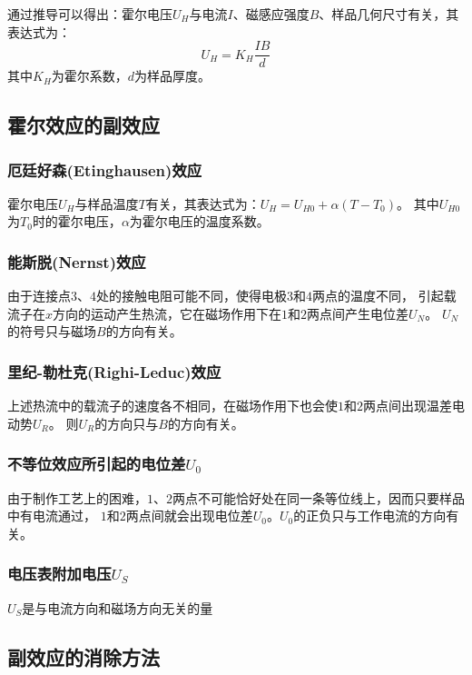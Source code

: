 \documentclass[UTF8]{ctexart}
\begin{document}
通过推导可以得出：霍尔电压$U_H$与电流$I$、磁感应强度$B$、样品几何尺寸有关，其表达式为：$$U_H = K_H\frac{IB}{d}$$其中$K_H$为霍尔系数，$d$为样品厚度。

\subsection{霍尔效应的副效应}

\subsubsection{厄廷好森(Etinghausen)效应}

霍尔电压$U_H$与样品温度$T$有关，其表达式为：$U_H = U_{H0} + \alpha(T-T_0)$。
其中$U_{H0}$为$T_0$时的霍尔电压，$\alpha$为霍尔电压的温度系数。

\subsubsection{能斯脱(Nernst)效应}

由于连接点$3$、$4$处的接触电阻可能不同，使得电极$3$和$4$两点的温度不同，
引起载流子在$x$方向的运动产生热流，它在磁场作用下在$1$和$2$两点间产生电位差$U_N$。
$U_N$的符号只与磁场$B$的方向有关。

\subsubsection{里纪-勒杜克(Righi-Leduc)效应}

上述热流中的载流子的速度各不相同，在磁场作用下也会使$1$和$2$两点间出现温差电动势$U_R$。
则$U_R$的方向只与$B$的方向有关。

\subsubsection{不等位效应所引起的电位差$U_0$}

由于制作工艺上的困难，$1$、$2$两点不可能恰好处在同一条等位线上，因而只要样品中有电流通过，
$1$和$2$两点间就会出现电位差$U_0$。$U_0$的正负只与工作电流的方向有关。

\subsubsection{电压表附加电压$U_S$}

$U_S$是与电流方向和磁场方向无关的量

\subsection{副效应的消除方法}
\end{document}
